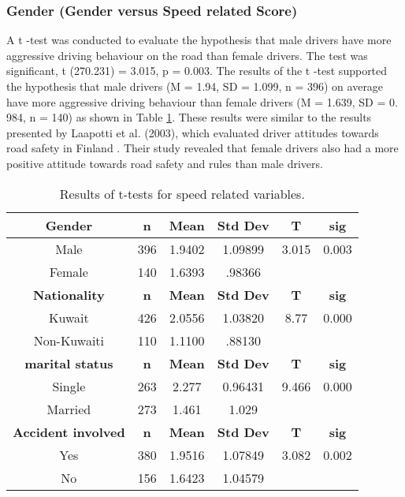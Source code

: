 \documentclass[preprint,12pt,a4paper,authoryear]{elsarticle}
\begin{document}
\begin{linenumbers}
\subsubsection{Gender (Gender versus Speed related Score)}

A t -test was conducted to evaluate the hypothesis that male drivers have more aggressive driving behaviour on the road than female drivers. The test was significant, t (270.231) = 3.015, p = 0.003. The results of the t -test supported the hypothesis that male drivers (M = 1.94, SD = 1.099, n = 396) on average have more aggressive driving behaviour than female drivers (M = 1.639, SD = 0. 984, n = 140) as shown in Table \ref{tab:sexdiff}. These results were similar to the results presented by Laapotti et al. (2003), which evaluated driver attitudes towards road safety in Finland \citep{Laapotti2003}. Their study revealed that female drivers also had a more positive attitude towards road safety and rules than male drivers.

\begin{table}[H]
\centering
\caption{Results of t-tests for speed related variables.}
\label{tab:sexdiff}
\begin{tabular}{@{}cccccc@{}}
\toprule
\textbf{Gender} & \textbf{n} & \textbf{Mean} & \textbf{Std Dev} & \textbf{T} & \textbf{sig} \\ \midrule
Male & 396 & 1.9402 & 1.09899 & 3.015 & 0.003 \\
Female & 140 & 1.6393 & .98366 &  &  \\ \midrule
\textbf{Nationality} & \textbf{n} & \textbf{Mean} & \textbf{Std Dev} & \textbf{T} & \textbf{sig} \\ \midrule
Kuwait & 426 & 2.0556 & 1.03820 & 8.77 & 0.000 \\
Non-Kuwaiti & 110 & 1.1100 & .88130 &  &  \\ \midrule
\textbf{marital status} & \textbf{n} & \textbf{Mean} & \textbf{Std Dev} & \textbf{T} & \textbf{sig} \\ \midrule
Single & 263 & 2.277 & 0.96431 & 9.466 & 0.000 \\
Married & 273 & 1.461 & 1.029 &  &  \\ \midrule
\textbf{Accident involved} & \textbf{n} & \textbf{Mean} & \textbf{Std Dev} & \textbf{T} & \textbf{sig} \\ \midrule
Yes & 380 & 1.9516 & 1.07849 & 3.082 & 0.002 \\
No & 156 & 1.6423 & 1.04579 &  &  \\ \bottomrule
\end{tabular}
\end{table}


\end{linenumbers}
\end{document}
